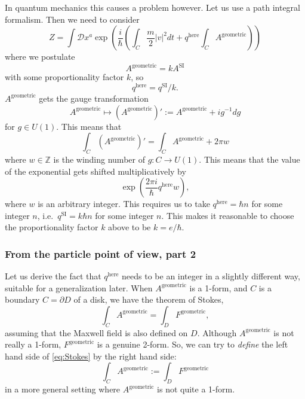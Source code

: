 \documentclass[12pt]{article}
\numberwithin{equation}{section}
\numberwithin{figure}{section}
\theoremstyle{remark}
\def\bZ{\mathbb{Z}}
\begin{document}
In quantum mechanics this causes a problem however. 
Let us use a path integral formalism. Then we need to consider \begin{equation}
Z=\int \mathcal D x^a \exp\left( \frac{i}{\hbar}(\int_C \frac m2 |v|^2 dt  +  q^\text{here} \int_C A^\text{geometric}) \right) 
\end{equation}
where we postulate \begin{equation}
A^\text{geometric} = k A^\text{SI}
\end{equation}
with some proportionality factor $k$, so \begin{equation}
q^\text{here} = q^\text{SI}/k.
\end{equation}
$A^\text{geometric} $ gets the gauge transformation \begin{equation}
A^\text{geometric} \mapsto  (A^\text{geometric}) ' := A^\text{geometric} +  i g^{-1} d g
\end{equation}  for $g\in U(1)$.
This means that \begin{equation}
\int_C (A^\text{geometric})'
=
\int_C A^\text{geometric}
+  2\pi w
\end{equation}
where $w\in \bZ$ is the winding number of $g:C\to U(1)$.
This means that the value of the exponential gets shifted multiplicatively by \begin{equation}
\exp(\frac{2\pi i}{\hbar} q^\text{here} w ),
\end{equation} where $w$ is an arbitrary integer.
This requires us to take $q^\text{here}=\hbar n$ for some integer $n$,
i.e.~$q^\text{SI}= k \hbar n $ for some integer $n$.
This makes it reasonable to choose the proportionality factor $k$ above to be $k=e/\hbar$.

\subsubsection{From the particle point of view, part 2}

Let us derive the fact that $q^\text{here}$ needs to be an integer in a slightly different way,
suitable for a generalization later. 
When $A^\text{geometric}$ is a 1-form, and $C$ is a boundary $C=\partial D$ of a disk,
we have the theorem of Stokes, \begin{equation}
\int _C A^\text{geometric} = \int_D F^\text{geometric},
\label{eq:Stokes}
\end{equation}
assuming that the Maxwell field is also defined on $D$.
Although $A^\text{geometric}$ is not really a 1-form,
$F^\text{geometric}$ is a genuine 2-form.
So, we can try to \emph{define} the left hand side of \eqref{eq:Stokes} by the right hand side: \begin{equation}
\int _C A^\text{geometric} := \int_D F^\text{geometric}
\end{equation}
in a more general setting where $A^\text{geometric}$ is not quite a 1-form.
\end{document}
